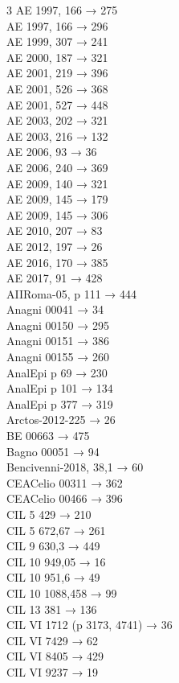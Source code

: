 \begin{multicols}{3}
AE 1997, 166 → 275\\
AE 1997, 166 → 296\\
AE 1999, 307 → 241\\
AE 2000, 187 → 321\\
AE 2001, 219 → 396\\
AE 2001, 526 → 368\\
AE 2001, 527 → 448\\
AE 2003, 202 → 321\\
AE 2003, 216 → 132\\
AE 2006, 93 → 36\\
AE 2006, 240 → 369\\
AE 2009, 140 → 321\\
AE 2009, 145 → 179\\
AE 2009, 145 → 306\\
AE 2010, 207 → 83\\
AE 2012, 197 → 26\\
AE 2016, 170 → 385\\
AE 2017, 91 → 428\\
AIIRoma-05, p 111 → 444\\
Anagni 00041 → 34\\
Anagni 00150 → 295\\
Anagni 00151 → 386\\
Anagni 00155 → 260\\
AnalEpi p 69 → 230\\
AnalEpi p 101 → 134\\
AnalEpi p 377 → 319\\
Arctos-2012-225 → 26\\
BE 00663 → 475\\
Bagno 00051 → 94\\
Bencivenni-2018, 38,1 → 60\\
CEACelio 00311 → 362\\
CEACelio 00466 → 396\\
CIL 5 429 → 210\\
CIL 5 672,67 → 261\\
CIL 9 630,3 → 449\\
CIL 10 949,05 → 16\\
CIL 10 951,6 → 49\\
CIL 10 1088,458 → 99\\
CIL 13 381 → 136\\
CIL VI 1712 (p 3173, 4741) → 36\\
CIL VI 7429 → 62\\
CIL VI 8405 → 429\\
CIL VI 9237 → 19\\

\end{multicols}
